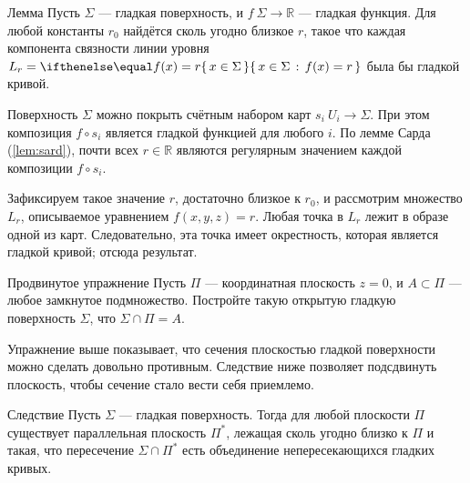 \begin{thm}{Лемма}\label{lem:reg-section}
Пусть $\Sigma$ --- гладкая поверхность, и $f\:\Sigma\to\mathbb{R}$ --- гладкая функция.
Для любой константы $r_0$ найдётся сколь угодно близкое $r$, такое что 
каждая компонента связности линии уровня $L_r=\set{x\in\Sigma}{f(x)=r}$ была бы гладкой кривой.
\end{thm}

Поверхность $\Sigma$ можно покрыть счётным набором карт $s_i\:U_i\to \Sigma$.
При этом композиция $f\circ s_i$ является гладкой функцией для любого $i$.
По лемме Сарда (\ref{lem:sard}), почти всех $r\in \mathbb{R}$ являются регулярным значением каждой композиции $f\circ s_i$.

Зафиксируем такое значение $r$, достаточно близкое к $r_0$, и рассмотрим множество $L_r$, описываемое уравнением $f(x,y,z)=r$.
Любая точка в $L_r$ лежит в образе одной из карт.
Следовательно, эта точка имеет окрестность, которая является гладкой кривой;
отсюда результат.
\qeds

\begin{thm}{Продвинутое упражнение}\label{ex:plane-section}
Пусть $\Pi$ --- координатная плоскость $z=0$, и $A \subset \Pi$ --- любое замкнутое подмножество.
Постройте такую открытую гладкую поверхность $\Sigma$, что $\Sigma \cap \Pi = A$.
\end{thm}

Упражнение выше показывает, что сечения плоскостью гладкой поверхности можно сделать довольно противным.
Следствие ниже позволяет подсдвинуть плоскость, чтобы сечение стало вести себя приемлемо.

\begin{thm}{Следствие}
Пусть $\Sigma$ --- гладкая поверхность.
Тогда для любой плоскости $\Pi$ существует параллельная плоскость $\Pi^{*}$, лежащая сколь угодно близко к $\Pi$ и такая, что пересечение $\Sigma\cap\Pi^{*}$ есть объединение непересекающихся гладких кривых.
\end{thm}
